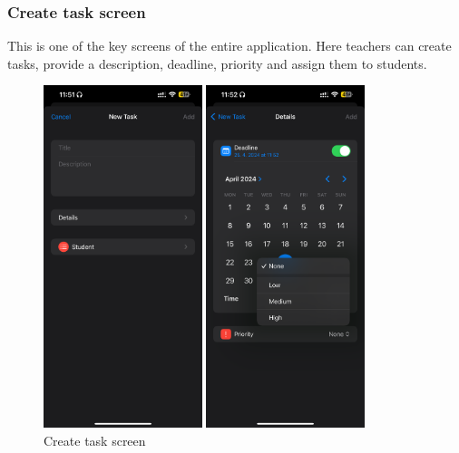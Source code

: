 \documentclass[
  biblatex = false,
  language=english,
  figures=false,
  sourcecodes,
  glossaries,
  index
]{kidiplom}
\begin{document}
\subsubsection{Create task screen}
This is one of the key screens of the entire application. Here teachers can create tasks, provide a description, deadline, priority and assign them to students.

\begin{figure}[ht]
\centering
\begin{minipage}[b]{0.4\textwidth}
	\includegraphics[height=10cm]{image10}
\end{minipage}
\begin{minipage}[b]{0.4\textwidth}
	\includegraphics[height=10cm]{image11}
\end{minipage}
\caption{Create task screen}
\label{fig:image10-11}
\end{figure}
\end{document}
